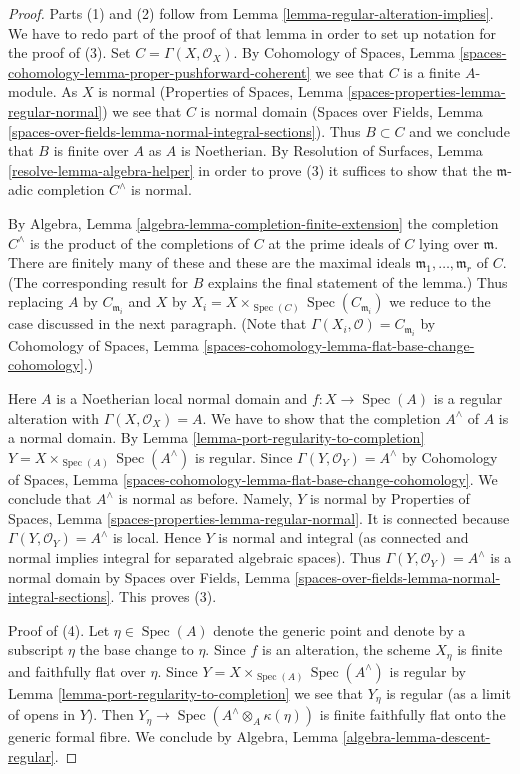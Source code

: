 \documentclass{stacks-project}
\theoremstyle{plain}
\theoremstyle{definition}
\theoremstyle{remark}
\numberwithin{equation}{subsection}
\def\Spec{\mathop{\mathrm{Spec}}}
\begin{document}
\begin{proof}
Parts (1) and (2) follow from Lemma \ref{lemma-regular-alteration-implies}.
We have to redo part of the proof of that lemma in order to set up notation
for the proof of (3). Set $C = \Gamma(X, \mathcal{O}_X)$. By
Cohomology of Spaces, Lemma
\ref{spaces-cohomology-lemma-proper-pushforward-coherent}
we see that $C$ is a finite $A$-module.
As $X$ is normal
(Properties of Spaces, Lemma
\ref{spaces-properties-lemma-regular-normal})
we see that $C$ is normal domain
(Spaces over Fields, Lemma
\ref{spaces-over-fields-lemma-normal-integral-sections}).
Thus $B \subset C$ and we conclude that $B$ is finite over $A$
as $A$ is Noetherian. By
Resolution of Surfaces, Lemma \ref{resolve-lemma-algebra-helper}
in order to prove (3) it suffices to show
that the $\mathfrak m$-adic completion $C^\wedge$ is normal.

\medskip\noindent
By Algebra, Lemma \ref{algebra-lemma-completion-finite-extension}
the completion $C^\wedge$ is the product of the completions of
$C$ at the prime ideals of $C$ lying over $\mathfrak m$.
There are finitely many of these and these are the maximal
ideals $\mathfrak m_1, \ldots, \mathfrak m_r$ of $C$.
(The corresponding result for $B$ explains the final statement of the lemma.)
Thus replacing $A$ by $C_{\mathfrak m_i}$ and $X$ by
$X_i = X \times_{\Spec(C)} \Spec(C_{\mathfrak m_i})$
we reduce to the case discussed in the next paragraph.
(Note that $\Gamma(X_i, \mathcal{O}) = C_{\mathfrak m_i}$ by
Cohomology of Spaces,
Lemma \ref{spaces-cohomology-lemma-flat-base-change-cohomology}.)

\medskip\noindent
Here $A$ is a Noetherian local normal domain and $f : X \to \Spec(A)$
is a regular alteration with $\Gamma(X, \mathcal{O}_X) = A$.
We have to show that the completion $A^\wedge$
of $A$ is a normal domain. By
Lemma \ref{lemma-port-regularity-to-completion}
$Y = X \times_{\Spec(A)} \Spec(A^\wedge)$ is regular.
Since $\Gamma(Y, \mathcal{O}_Y) = A^\wedge$
by Cohomology of Spaces,
Lemma \ref{spaces-cohomology-lemma-flat-base-change-cohomology}.
We conclude that $A^\wedge$ is normal as before.
Namely, $Y$ is normal by Properties of Spaces, Lemma
\ref{spaces-properties-lemma-regular-normal}.
It is connected because $\Gamma(Y, \mathcal{O}_Y) = A^\wedge$ is local.
Hence $Y$ is normal and integral (as connected and normal
implies integral for separated algebraic spaces). Thus
$\Gamma(Y, \mathcal{O}_Y) = A^\wedge$ is a normal domain by
Spaces over Fields, Lemma
\ref{spaces-over-fields-lemma-normal-integral-sections}.
This proves (3).

\medskip\noindent
Proof of (4). Let $\eta \in \Spec(A)$ denote the generic point
and denote by a subscript $\eta$ the base change to $\eta$.
Since $f$ is an alteration, the scheme $X_\eta$ is finite and
faithfully flat over $\eta$. Since $Y = X \times_{\Spec(A)} \Spec(A^\wedge)$
is regular by Lemma \ref{lemma-port-regularity-to-completion}
we see that $Y_\eta$ is regular (as a limit of opens in $Y$).
Then $Y_\eta \to \Spec(A^\wedge \otimes_A \kappa(\eta))$ is finite
faithfully flat onto the generic formal fibre. We conclude by
Algebra, Lemma \ref{algebra-lemma-descent-regular}.
\end{proof}
\end{document}
